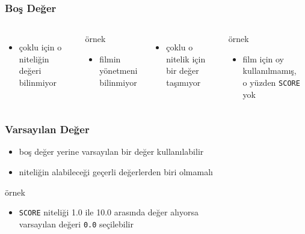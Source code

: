 \documentclass[dvipsnames]{beamer}
\theoremstyle{plain}
\begin{document}
\begin{frame}
  \frametitle{Boş Değer}

  \begin{columns}[t]
    \begin{itemize}
      \item çoklu için o niteliğin\\
	değeri bilinmiyor
    \end{itemize}
    
    \medskip
    \begin{exampleblock}{örnek}
      \begin{itemize}
        \item filmin yönetmeni\\
	  bilinmiyor
      \end{itemize}
    \end{exampleblock}

    \pause
    \begin{itemize}
      \item çoklu o nitelik için\\
	bir değer taşımıyor
    \end{itemize}
    
     \medskip
    \begin{exampleblock}{örnek}
      \begin{itemize}
        \item film için oy kullanılmamış,\\
          o yüzden \texttt{SCORE} yok
      \end{itemize}
    \end{exampleblock}
  \end{columns}
\end{frame}


\begin{frame}
  \frametitle{Varsayılan Değer}

  \begin{itemize}
    \item boş değer yerine varsayılan bir değer kullanılabilir
    \item niteliğin alabileceği geçerli değerlerden biri olmamalı
  \end{itemize}
  
   \medskip
  \begin{exampleblock}{örnek}
    \begin{itemize}
      \item \texttt{SCORE} niteliği 1.0 ile 10.0 arasında değer alıyorsa\\
	varsayılan değeri \texttt{0.0} seçilebilir
    \end{itemize}
  \end{exampleblock}
\end{frame}
\end{document}
